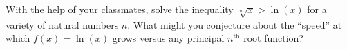{With the help of your classmates, solve the inequality $\sqrt[n]{x} > \ln(x)$ for a variety of natural numbers $n$.  What might you conjecture about the ``speed'' at which $f(x) = \ln(x)$ grows versus any principal $n^{\textrm{th}}$ root function?}
{}

